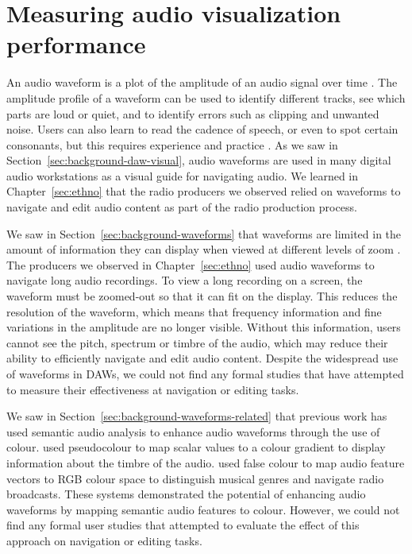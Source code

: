 \chapter{Measuring audio visualization performance}\label{sec:colourised}


An audio waveform is a plot of the amplitude of an audio signal over time \citep[p.~92]{Hausman2012}.  The amplitude
profile of a waveform can be used to identify different tracks, see which parts are loud or quiet, and to identify
errors such as clipping and unwanted noise.  Users can also learn to read the cadence of speech, or even to spot
certain consonants, but this requires experience and practice \citep[p.~115]{Hausman2012}.  As we saw in
Section~\ref{sec:background-daw-visual}, audio waveforms are used in many digital audio workstations as a visual guide
for navigating audio. We learned in Chapter~\ref{sec:ethno} that the radio producers we observed relied on
waveforms to navigate and edit audio content as part of the radio production process.

We saw in Section~\ref{sec:background-waveforms} that waveforms are limited in the amount of information they can
display when viewed at different levels of zoom \citep{Loviscach2011}.  The producers we observed in
Chapter~\ref{sec:ethno} used audio waveforms to navigate long audio recordings. To view a long recording on a screen,
the waveform must be zoomed-out so that it can fit on the display.  This reduces the resolution of the waveform, which
means that frequency information and fine variations in the amplitude are no longer visible.  Without this information,
users cannot see the pitch, spectrum or timbre of the audio, which may reduce their ability to efficiently navigate and
edit audio content.  Despite the widespread use of waveforms in DAWs, we could not find any formal studies that have
attempted to measure their effectiveness at navigation or editing tasks.

We saw in Section~\ref{sec:background-waveforms-related} that previous work has used semantic audio analysis to enhance
audio waveforms through the use of colour.  \citet{Rice2005,Akkermans2011,Loviscach2011a} used pseudocolour to map
scalar values to a colour gradient to display information about the timbre of the audio.
\citet{Tzanetakis2000,Mason2007} used false colour to map audio feature vectors to RGB colour space to distinguish
musical genres and navigate radio broadcasts.  These systems demonstrated the potential of enhancing audio waveforms by
mapping semantic audio features to colour. However, we could not find any formal user studies that attempted to
evaluate the effect of this approach on navigation or editing tasks.

